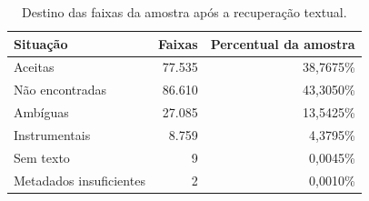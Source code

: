 \begin{table}[htbp]
\centering\small
\caption{Destino das faixas da amostra após a recuperação textual.}
\label{tab:cobertura}
\begin{tabular}{lrr}
\toprule
Situação & Faixas & Percentual da amostra \\
\midrule
Aceitas & 77.535 & 38,7675\% \\
Não encontradas & 86.610 & 43,3050\% \\
Ambíguas & 27.085 & 13,5425\% \\
Instrumentais & 8.759 & 4,3795\% \\
Sem texto & 9 & 0,0045\% \\
Metadados insuficientes & 2 & 0,0010\% \\
\bottomrule
\end{tabular}
\end{table}
